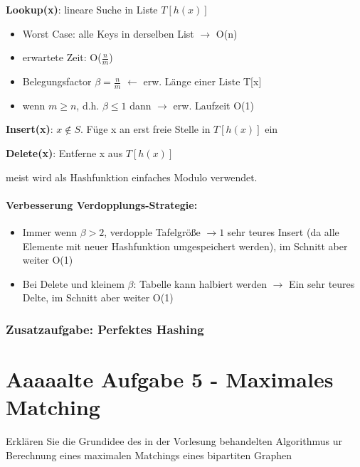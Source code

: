 \documentclass[10pt,a4paper]{article}
\begin{document}
\textbf{Lookup(x)}: lineare Suche in Liste $T[h(x)]$ \\ 
\begin{itemize}
	\item Worst Case: alle Keys in derselben List $\rightarrow$ O(n)
	\item erwartete Zeit: O($\frac{n}{m}$)
	\item Belegungsfactor $\beta = \frac{n}{m}$ $\leftarrow$ erw. Länge einer Liste T[x]
	\item wenn $m \geq n$, d.h. $\beta \leq 1$ dann $\rightarrow$ erw. Laufzeit O(1)
\end{itemize}


\textbf{Insert(x)}: $x\notin S.$ Füge x an erst freie Stelle in $T[h(x)]$ ein

\textbf{Delete(x)}: Entferne x aus $T[h(x)]$

\begin{center}
	\resizebox{.6\columnwidth}{!}{
		
	}
\end{center}
meist wird als Hashfunktion einfaches Modulo verwendet.

\paragraph*{Verbesserung Verdopplungs-Strategie:}
\begin{itemize}
	\item Immer wenn $\beta>2$, verdopple Tafelgröße $\rightarrow1$ sehr teures Insert (da alle Elemente mit neuer Hashfunktion umgespeichert werden), im Schnitt aber weiter O(1)\\ 
	\item Bei Delete und kleinem $\beta$: Tabelle kann halbiert werden $\rightarrow$ Ein sehr teures Delte, im Schnitt aber weiter O(1)
\end{itemize}

\subsubsection*{Zusatzaufgabe: Perfektes Hashing}



\section*{Aaaaalte Aufgabe 5 - Maximales Matching}
Erklären Sie die Grundidee des in der Vorlesung behandelten Algorithmus ur Berechnung eines maximalen Matchings eines bipartiten Graphen
\end{document}

